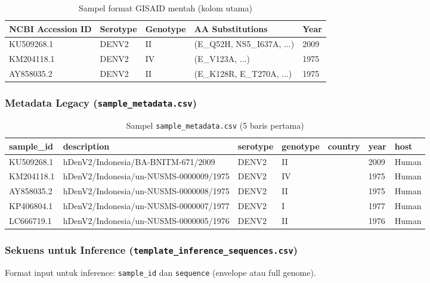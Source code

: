 \documentclass[12pt,a4paper]{article}
\begin{document}
\begin{table}[h]
\centering
\caption{Sampel format GISAID mentah (kolom utama)}
\small
\begin{tabular}{@{}lllll@{}}
\toprule
\textbf{NCBI Accession ID} & \textbf{Serotype} & \textbf{Genotype} & \textbf{AA Substitutions} & \textbf{Year} \\
\midrule
KU509268.1 & DENV2 & II & (E\_Q52H, NS5\_I637A, ...) & 2009 \\
KM204118.1 & DENV2 & IV & (E\_V123A, ...) & 1975 \\
AY858035.2 & DENV2 & II & (E\_K128R, E\_T270A, ...) & 1975 \\
\bottomrule
\end{tabular}
\end{table}

\subsubsection{Metadata Legacy (\texttt{sample\_metadata.csv})}

\begin{table}[h]
\centering
\caption{Sampel \texttt{sample\_metadata.csv} (5 baris pertama)}
\small
\begin{tabular}{@{}lllllll@{}}
\toprule
\textbf{sample\_id} & \textbf{description} & \textbf{serotype} & \textbf{genotype} & \textbf{country} & \textbf{year} & \textbf{host} \\
\midrule
KU509268.1 & hDenV2/Indonesia/BA-BNITM-671/2009 & DENV2 & II & & 2009 & Human \\
KM204118.1 & hDenV2/Indonesia/un-NUSMS-0000009/1975 & DENV2 & IV & & 1975 & Human \\
AY858035.2 & hDenV2/Indonesia/un-NUSMS-0000008/1975 & DENV2 & II & & 1975 & Human \\
KP406804.1 & hDenV2/Indonesia/un-NUSMS-0000007/1977 & DENV2 & I & & 1977 & Human \\
LC666719.1 & hDenV2/Indonesia/un-NUSMS-0000005/1976 & DENV2 & II & & 1976 & Human \\
\bottomrule
\end{tabular}
\end{table}

\subsubsection{Sekuens untuk Inference (\texttt{template\_inference\_sequences.csv})}

Format input untuk inference: \texttt{sample\_id} dan \texttt{sequence} (envelope atau full genome).
\end{document}
